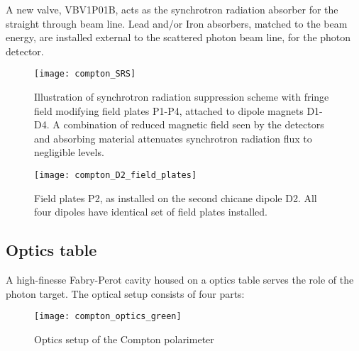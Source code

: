 {A new valve, VBV1P01B, acts as the synchrotron radiation absorber for the straight through beam line. Lead and/or Iron absorbers, matched to the beam energy, are installed external to the scattered photon beam line, for the photon detector.
\begin{figure}[htp]
    \begin{center}
        \texttt{[image: compton\_SRS]}
    \end{center}
\caption{ Illustration of synchrotron radiation suppression scheme with fringe field modifying field plates P1-P4, attached to dipole magnets D1-D4. A combination of reduced magnetic field seen by the  detectors and absorbing material attenuates synchrotron radiation flux to negligible  levels. }
    \label{fig:compton_SRS}
 \end{figure}


\begin{figure}[htp]
    \begin{center}
        \texttt{[image: compton\_D2\_field\_plates]}
    \end{center}
    \caption[compton:Field plates]{
            Field plates P2, as  installed on the second chicane dipole D2.  All four dipoles have identical set of field plates installed.}
    \label{fig:compton_field_plates}
 \end{figure}

\subsection{Optics table}
\label{sec:compton_optics}
A high-finesse Fabry-Perot cavity housed on a optics table serves the role of the photon target.
The optical setup consists of four parts:
\begin{figure}[htp]
    \begin{center}
        \texttt{[image: compton\_optics\_green]}
    \end{center}
    \caption[compton:Optics Table]{
            Optics setup  of the  Compton polarimeter
            }
    \label{fig:compton_optics}
 \end{figure}

}
